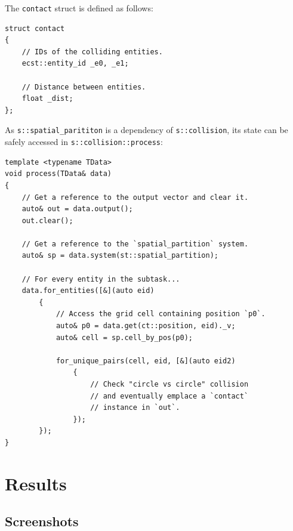 \documentclass[twoside, 12pt, a4paper, openright]{book}
\begin{document}
The
\texttt{contact}
struct is defined as follows:

\begin{verbatim}
struct contact
{
    // IDs of the colliding entities.
    ecst::entity_id _e0, _e1;

    // Distance between entities.
    float _dist;
};
\end{verbatim}

As
\texttt{s::spatial_parititon}
is a dependency of
\texttt{s::collision},
its state can be safely accessed in
\texttt{s::collision::process}:

\begin{verbatim}
template <typename TData>
void process(TData& data)
{
    // Get a reference to the output vector and clear it.
    auto& out = data.output();
    out.clear();

    // Get a reference to the `spatial_partition` system.
    auto& sp = data.system(st::spatial_partition);

    // For every entity in the subtask...
    data.for_entities([&](auto eid)
        {
            // Access the grid cell containing position `p0`.
            auto& p0 = data.get(ct::position, eid)._v;
            auto& cell = sp.cell_by_pos(p0);

            for_unique_pairs(cell, eid, [&](auto eid2)
                {
                    // Check "circle vs circle" collision
                    // and eventually emplace a `contact`
                    // instance in `out`.
                });
        });
}
\end{verbatim}

\chapter{Results}\label{results}

\section{Screenshots}\label{screenshots}
\end{document}
